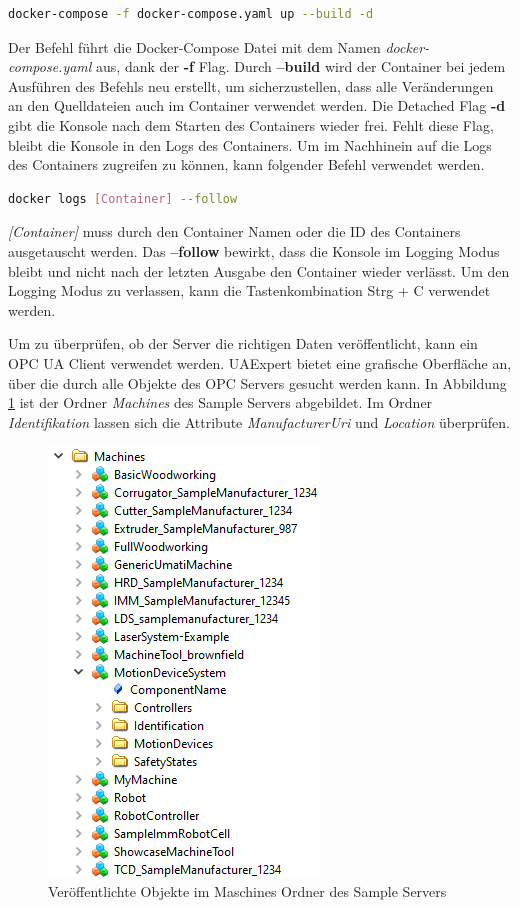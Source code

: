 \documentclass[a4paper, 12pt, oneside, toc=listofnumbered, bibliography=totoc]{scrbook}
\begin{document}
		\begin{lstlisting}[numbers=none, language=bash, frame=single]
			docker-compose -f docker-compose.yaml up --build -d
		\end{lstlisting}
	
		Der Befehl führt die Docker-Compose Datei mit dem Namen \textit{docker-compose.yaml} aus, dank der \textbf{-f} Flag. Durch \textbf{--build} wird der Container bei jedem Ausführen des Befehls neu erstellt, um sicherzustellen, dass alle Veränderungen an den Quelldateien auch im Container verwendet werden. Die Detached Flag \textbf{-d} gibt die Konsole nach dem Starten des Containers wieder frei. Fehlt diese Flag, bleibt die Konsole in den Logs des Containers. Um im Nachhinein auf die Logs des Containers zugreifen zu können, kann folgender Befehl verwendet werden. 
		
		\begin{lstlisting}[numbers=none, language=bash, frame=single]
			docker logs [Container] --follow
		\end{lstlisting}
		
		\textit{[Container]} muss durch den Container Namen oder die ID des Containers ausgetauscht werden. Das \textbf{--follow} bewirkt, dass die Konsole im Logging Modus bleibt und nicht nach der letzten Ausgabe den Container wieder verlässt. Um den Logging Modus zu verlassen, kann die Tastenkombination Strg + C verwendet werden.
		
		Um zu überprüfen, ob der Server die richtigen Daten veröffentlicht, kann ein OPC UA Client verwendet werden. UAExpert bietet eine grafische Oberfläche an, über die durch alle Objekte des OPC Servers gesucht werden kann. In Abbildung \ref{fig:UAExpert} ist der Ordner \textit{Machines} des Sample Servers abgebildet. Im Ordner \textit{Identifikation} lassen sich die Attribute \textit{ManufacturerUri} und \textit{Location} überprüfen.
		
		\begin{figure}[H]
			\centering
			\includegraphics[height=0.7\linewidth]{res/UAExpert.png}
			\caption{Veröffentlichte Objekte im Maschines Ordner des Sample Servers}
			\label{fig:UAExpert}
		\end{figure}
		
\end{document}
